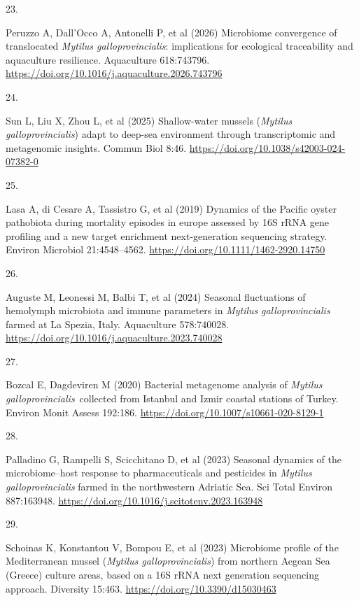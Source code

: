 \documentclass[
  12 pt,
]{article}
\newlength{\cslhangindent}
\newlength{\csllabelwidth}
\newenvironment{CSLReferences}[2] %
 {\begin{list}{}{%
  \setlength{\itemindent}{0pt}
  \setlength{\leftmargin}{0pt}
  \setlength{\parsep}{0pt}
  \ifodd #1
   \setlength{\leftmargin}{\cslhangindent}
   \setlength{\itemindent}{-1\cslhangindent}
  \fi
  \setlength{\itemsep}{#2\baselineskip}}}
 {\end{list}}
\newcommand{\CSLLeftMargin}[1]{\parbox[t]{\csllabelwidth}{\strut#1\strut}}
\newcommand{\CSLRightInline}[1]{\parbox[t]{\linewidth - \csllabelwidth}{\strut#1\strut}}
\begin{document}
\begin{CSLReferences}{0}{0}
\CSLLeftMargin{23. }%
\CSLRightInline{Peruzzo A, Dall'Occo A, Antonelli P, et al (2026) Microbiome convergence of translocated {{\emph{Mytilus galloprovincialis}}}: implications for ecological traceability and aquaculture resilience. Aquaculture 618:743796. \url{https://doi.org/10.1016/j.aquaculture.2026.743796}}

\CSLLeftMargin{24. }%
\CSLRightInline{Sun L, Liu X, Zhou L, et al (2025) Shallow-water mussels ({{\emph{Mytilus galloprovincialis}}}) adapt to deep-sea environment through transcriptomic and metagenomic insights. Commun Biol 8:46. \url{https://doi.org/10.1038/s42003-024-07382-0}}

\CSLLeftMargin{25. }%
\CSLRightInline{Lasa A, di Cesare A, Tassistro G, et al (2019) Dynamics of the {Pacific} oyster pathobiota during mortality episodes in europe assessed by {16S rRNA} gene profiling and a new target enrichment next-generation sequencing strategy. Environ Microbiol 21:4548--4562. \url{https://doi.org/10.1111/1462-2920.14750}}

\CSLLeftMargin{26. }%
\CSLRightInline{Auguste M, Leonessi M, Balbi T, et al (2024) Seasonal fluctuations of hemolymph microbiota and immune parameters in {{\emph{Mytilus}}}{{\emph{ galloprovincialis}}} farmed at {La Spezia}, {Italy}. Aquaculture 578:740028. \url{https://doi.org/10.1016/j.aquaculture.2023.740028}}

\CSLLeftMargin{27. }%
\CSLRightInline{Bozcal E, Dagdeviren M (2020) Bacterial metagenome analysis of {{\emph{Mytilus}}}{{\emph{ galloprovincialis}}}~collected from {Istanbul} and {Izmir} coastal stations of {Turkey}. Environ Monit Assess 192:186. \url{https://doi.org/10.1007/s10661-020-8129-1}}

\CSLLeftMargin{28. }%
\CSLRightInline{Palladino G, Rampelli S, Scicchitano D, et al (2023) Seasonal dynamics of the microbiome--host response to pharmaceuticals and pesticides in {{\emph{Mytilus}}}{{\emph{ galloprovincialis}}} farmed in the northwestern {Adriatic Sea}. Sci Total Environ 887:163948. \url{https://doi.org/10.1016/j.scitotenv.2023.163948}}

\CSLLeftMargin{29. }%
\CSLRightInline{Schoinas K, Konstantou V, Bompou E, et al (2023) Microbiome profile of the {Mediterranean} mussel ({{\emph{Mytilus galloprovincialis}}}) from northern {Aegean Sea} ({Greece}) culture areas, based on a {16S rRNA} next generation sequencing approach. Diversity 15:463. \url{https://doi.org/10.3390/d15030463}}


\end{CSLReferences}
\end{document}
